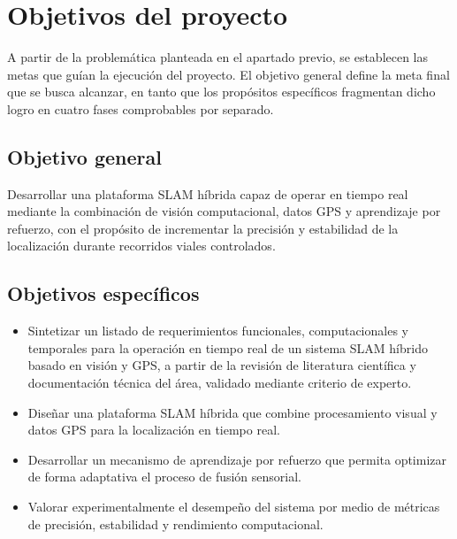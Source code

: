 \section{Objetivos del proyecto}

A partir de la problemática planteada en el apartado previo, se establecen las metas que guían la ejecución del proyecto.
El objetivo general define la meta final que se busca alcanzar, en tanto que los propósitos específicos fragmentan dicho logro en cuatro fases comprobables por separado.

\subsection{Objetivo general}

Desarrollar una plataforma SLAM híbrida capaz de operar en tiempo real mediante la combinación de visión computacional, datos GPS y aprendizaje por refuerzo, con el propósito de incrementar la precisión y estabilidad de la localización durante recorridos viales controlados.

\subsection{Objetivos específicos}

\begin{itemize}
    \item Sintetizar un listado de requerimientos funcionales, computacionales y temporales para la operación en tiempo real de un sistema SLAM híbrido basado en visión y GPS, a partir de la revisión de literatura científica y documentación técnica del área, validado mediante criterio de experto.
    
    \item Diseñar una plataforma SLAM híbrida que combine procesamiento visual y datos GPS para la localización en tiempo real.
    
    \item Desarrollar un mecanismo de aprendizaje por refuerzo que permita optimizar de forma adaptativa el proceso de fusión sensorial.

    \item Valorar experimentalmente el desempeño del sistema por medio de métricas de precisión, estabilidad y rendimiento computacional.
\end{itemize}

